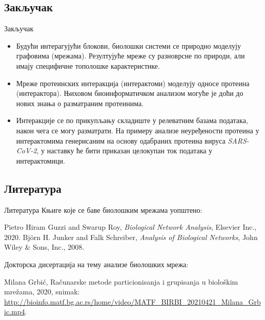 \documentclass[hyperref={bookmarks=false}]{beamer}
\begin{document}
\subsection{Закључак}
\begin{frame}{Закључак}
\begin{itemize}
	\item Будући интерагујући блокови, биолошки системи се природно моделују графовима (мрежама). Резултујуће мреже су разноврсне по природи, али имају специфичне тополошке карактеристике.

	\item Мреже протеинских интеракција (интерактоми) моделују односе протеина (интерактора). Њиховом биоинформатичком анализом могуће је доћи до нових знања о разматраним протеинима.

	\item Интеракције се по прикупљању складиште у релеватним базама података, након чега се могу разматрати. На примеру анализе неуређености протеина у интерактомима генерисаним на основу одабраних протеина вируса \textit{SARS-CoV-2}, у наставку ће бити приказан целокупан ток података у интерактомици.
\end{itemize}
\end{frame}

\subsection{Литература}
\begin{frame}{Литература}
Књиге које се баве биолошким мрежама уопштено:
\begin{thebibliography}{2}
\bibitem{} Pietro Hiram Guzzi and Swarup Roy, \textit{Biological Network Analysis}, Elsevier Inc., 2020.
\bibitem{} Björn H. Junker and Falk Schreiber, \textit{Analysis of Biological Networks}, John Wiley \& Sons, Inc., 2008.
\end{thebibliography}

\bigskip

Докторска дисертација на тему анализе биолошких мрежа:
\begin{thebibliography}{1}
\bibitem{} Milana Grbić, Računarske metode particionisanja i grupisanja u biološkim mrežama, 2020, snimak: \url{http://bioinfo.matf.bg.ac.rs/home/video/MATF_BIRBI_20210421_Milana_Grbic.mp4}.
\end{thebibliography}
\end{frame}
\end{document}
